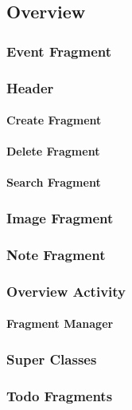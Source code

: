 \subsection{Overview}
	\subsubsection{Event Fragment}
	\subsubsection{Header}
		\paragraph{Create Fragment}
		\paragraph{Delete Fragment}
		\paragraph{Search Fragment}
	\subsubsection{Image Fragment}
	\subsubsection{Note Fragment}
	\subsubsection{Overview Activity}
		\paragraph{Fragment Manager}
	\subsubsection{Super Classes}
	\subsubsection{Todo Fragments}